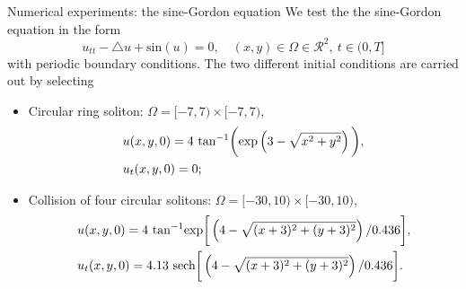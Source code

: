 \documentclass[10pt]{beamer}
\begin{document}
\begin{frame}{Numerical experiments: the sine-Gordon equation}
We test the the sine-Gordon equation in the form
\begin{equation*}
u_{tt}-\triangle u+\mbox{sin}\left(u\right)=0,\quad (x,y)\in\Omega\in\mathcal{R}^2,\ t\in (0,T]
\end{equation*} 
with periodic boundary conditions. The two different initial conditions are carried out by selecting
\begin{itemize}
\item Circular ring soliton: $\Omega=[-7,7)\times[-7,7)$,
\begin{align*}
\aligned
&u(x,y,0)=4\ \mbox{tan}^{-1}\bigg(\mbox{exp}\left(3-\sqrt{x^2+y^2}\right)\bigg),\\
&u_t(x,y,0)=0;
\endaligned
\end{align*}
\item Collision of four circular solitons: $\Omega=[-30,10)\times[-30,10)$,
\begin{align*}
\aligned
&u(x,y,0)=4\ \mbox{tan}^{-1}\mbox{exp}\bigg[\left(4-\sqrt{(x+3)^2+(y+3)^2}\right)/0.436\bigg],\\
&u_t(x,y,0)=4.13\ \mbox{sech}\bigg[\left(4-\sqrt{(x+3)^2+(y+3)^2}\right)/0.436\bigg].
\endaligned
\end{align*}
\end{itemize} 
\end{frame}
\end{document}
